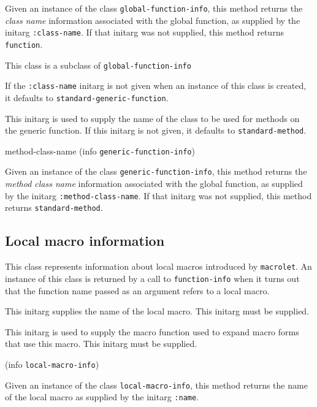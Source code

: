 Given an instance of the class \texttt{global-function-info}, this
method returns the \emph{class name} information
associated with the global function, as supplied by the initarg
\texttt{:class-name}.  If that initarg was not supplied, this
method returns \texttt{function}.


This class is a subclass of \texttt{global-function-info}

If the \texttt{:class-name} initarg is not given when an instance of
this class is created, it defaults to
\texttt{standard-generic-function}.


This initarg is used to supply the name of the class to be used for
methods on the generic function.  If this initarg is not given, it
defaults to \texttt{standard-method}.

\Defmethod method-class-name {(info {\tt generic-function-info})}

Given an instance of the class \texttt{generic-function-info}, this
method returns the \emph{method class name} information
associated with the global function, as supplied by the initarg
\texttt{:method-class-name}.  If that initarg was not supplied, this
method returns \texttt{standard-method}.

\subsection{Local macro information}


This class represents information about local macros introduced by
\texttt{macrolet}.  An instance of this class is returned by a call to
\texttt{function-info} when it turns out that the function name passed
as an argument refers to a local macro.


This initarg supplies the name of the local macro.  This initarg
must be supplied.


This initarg is used to supply the macro function used to expand macro
forms that use this macro.  This initarg must be supplied. 

 {(info {\tt local-macro-info})}

Given an instance of the class \texttt{local-macro-info}, this
method returns the name of the local macro as supplied by the
initarg \texttt{:name}.

